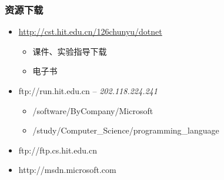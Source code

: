 \begin{frame}
\frametitle{资源下载}
\begin{itemize}
  \setlength{\itemsep}{.4cm plus 1pt}
\item \href{http://cst.hit.edu.cn/~chunyu/dotnet}{http://cst.hit.edu.cn/\char126chunyu/dotnet}
  \begin{itemize}
    \setlength{\itemsep}{.2cm plus 1pt}
  \item 课件、实验指导下载
  \item 电子书
  \end{itemize}
\item ftp://run.hit.edu.cn -- \textit{202.118.224.241}
  \begin{itemize}
    \setlength{\itemsep}{.2cm plus 1pt}
  \item /software/ByCompany/Microsoft
  \item /study/Computer\_Science/programming\_language
  \end{itemize}
\item ftp://ftp.cs.hit.edu.cn
\item http://msdn.microsoft.com
\end{itemize}

\end{frame}


